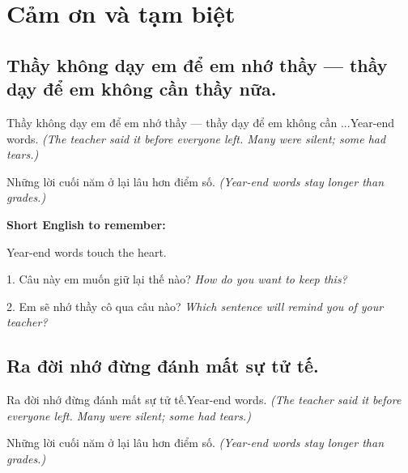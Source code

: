 \chapter{Cảm ơn và tạm biệt}


\section{Thầy không dạy em để em nhớ thầy — thầy dạy để em không cần thầy nữa.}
\begin{truyen}{Thầy không dạy em để em nhớ thầy — thầy dạy để em không cần ...}{Year-end words.}
\textit{(The teacher said it before everyone left. Many were silent; some had tears.)}
\end{truyen}

\begin{baihoc}
Những lời cuối năm ở lại lâu hơn điểm số.
\textit{(Year-end words stay longer than grades.)}
\end{baihoc}

\begin{ghinhoanh}
\textbf{Short English to remember:}

Year-end words touch the heart.

\end{ghinhoanh}

\begin{tuhocnhanh}
1. Câu này em muốn giữ lại thế nào? \textit{How do you want to keep this?}

2. Em sẽ nhớ thầy cô qua câu nào? \textit{Which sentence will remind you of your teacher?}
\end{tuhocnhanh}
\ngancach


\section{Ra đời nhớ đừng đánh mất sự tử tế.}
\begin{truyen}{Ra đời nhớ đừng đánh mất sự tử tế.}{Year-end words.}
\textit{(The teacher said it before everyone left. Many were silent; some had tears.)}
\end{truyen}

\begin{baihoc}
Những lời cuối năm ở lại lâu hơn điểm số.
\textit{(Year-end words stay longer than grades.)}
\end{baihoc}

